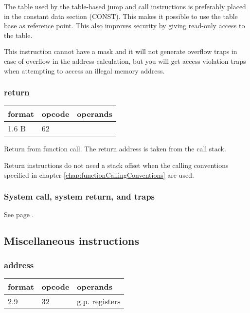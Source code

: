\documentclass[forwardcom.tex]{subfiles}
\begin{document}
The table used by the table-based jump and call instructions is preferably placed in the constant data section (CONST). This makes it possible to use the table base as reference point. This also improves security by giving read-only access to the table.
\vspace{2mm}

This instruction cannot have a mask and it will not generate overflow traps in case of overflow in the address calculation, but you will get access violation traps when attempting to access an illegal memory address.
\vspace{2mm}

\subsubsection{return}
\label{table:returnInstruction}
\begin{tabular}{|p{14mm}|p{12mm}|p{110mm}|}
\hline
\bfseries format & \bfseries opcode & \bfseries operands \\ \hline
1.6 B & 62 & \\ \hline
\end{tabular}
\vspace{2mm}

Return from function call. The return address is taken from the call stack.
\vspace{2mm}

Return instructions do not need a stack offset when the calling conventions specified in chapter \ref{chap:functionCallingConventions} are used.


\subsubsection{System call, system return, and traps}
See page \pageref{table:sysCallInstruction}.
\vspace{2mm}


\subsection{Miscellaneous instructions}

\subsubsection{address}
\label{table:addressInstruction}
\begin{tabular}{|p{12mm}|p{12mm}|p{110mm}|}
\hline
\bfseries format & \bfseries opcode & \bfseries operands \\ \hline
2.9 & 32 & g.p. registers \\ \hline
\end{tabular}
\vspace{2mm}
\end{document}

